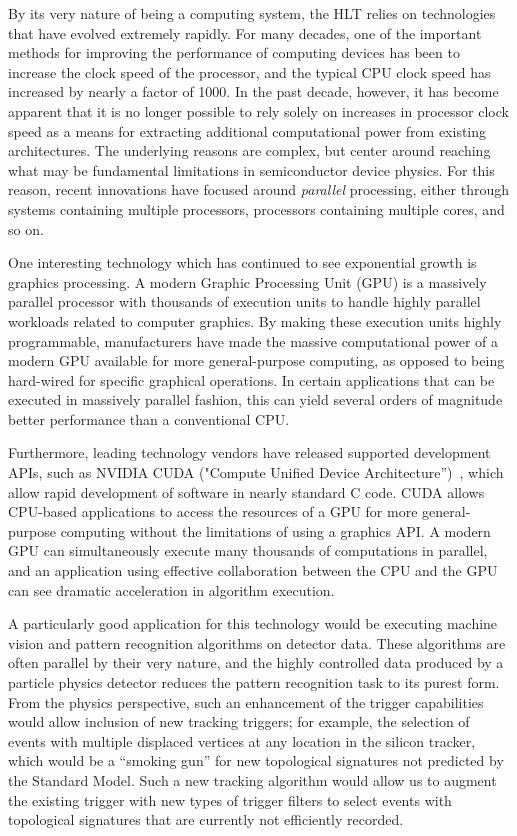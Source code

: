\documentclass{JINST}
\begin{document}
By its very nature of being a computing system, the HLT relies on technologies that have evolved
extremely rapidly.  For many decades, one of the important methods for improving the performance of computing devices
has been to increase the clock speed of the processor, and the typical CPU clock speed has increased by nearly a factor of 1000.
In the past decade, however, it has become apparent that it is no longer possible to rely solely on increases
in processor clock speed as a means for extracting additional computational power from existing architectures.
The underlying reasons are complex, but center around reaching what may be fundamental limitations in
semiconductor device physics.  For this reason, recent innovations have focused around {\em parallel}
processing, either through systems containing multiple processors, processors containing multiple cores, and so on.

One interesting technology which has continued to see exponential growth is graphics processing.  
A modern Graphic Processing Unit (GPU) is a massively parallel processor with thousands of execution units to handle highly parallel workloads
related to computer graphics.  By making these execution units highly programmable, manufacturers have made
the massive computational power of a modern GPU available for more general-purpose computing,
as opposed to being hard-wired for specific graphical operations.  In certain applications that can be executed in massively parallel
 fashion, this can yield several orders of magnitude better performance than a conventional CPU.

Furthermore, leading technology vendors have released supported development APIs, such as NVIDIA
CUDA ("Compute Unified Device Architecture'')~\cite{bib:CUDA}, which allow rapid development of
software in nearly standard C code. CUDA allows CPU-based applications to access the resources of a GPU 
for more general-purpose computing without the limitations of using a graphics API.
 A modern GPU can simultaneously execute many thousands of computations in parallel, and an application using 
effective collaboration between the CPU and the GPU can see dramatic acceleration in algorithm execution.

A particularly good application for this technology would be executing machine vision
and pattern recognition algorithms on detector data. These algorithms are often parallel
by their very nature, and the highly controlled data produced by a particle physics detector
reduces the pattern recognition task to its purest form.  From the physics perspective,
such an enhancement of the trigger capabilities would allow inclusion of new tracking triggers;
for example, the selection of events with multiple displaced
vertices at any location in the silicon tracker, which would be a ``smoking gun'' for new topological
signatures not predicted by the Standard Model. Such a new tracking algorithm would allow us to
augment the existing trigger with new types of trigger filters to select events with topological signatures
that are currently not efficiently recorded.
\end{document}
